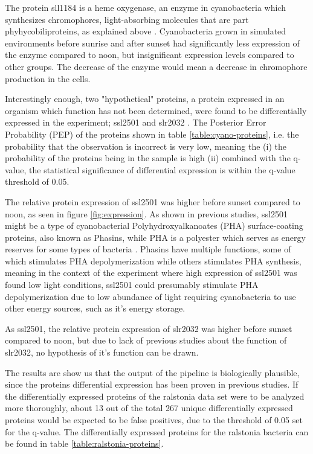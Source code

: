 The protein sll1184 is a heme oxygenase, an enzyme in cyanobacteria which synthesizes chromophores, light-absorbing molecules that are part phyhycobiliproteins, as explained above \cite{heme-oxygenase} \cite{heme-oxygenase-2}. Cyanobacteria grown in simulated environments before sunrise and after sunset had significantly less expression of the enzyme compared to noon, but insignificant expression levels compared to other groups. The decrease of the enzyme would mean a decrease in chromophore production in the cells.

Interestingly enough, two "hypothetical" proteins, a protein expressed in an organism which function has not been determined, were found to be differentially expressed in the experiment; ssl2501 and slr2032 \cite{hypothetical-protein1}. The Posterior Error Probability (PEP) of the proteins shown in table \ref{table:cyano-proteins}, i.e. the probability that the observation is incorrect is very low, meaning the (i) the probability of the proteins being in the sample is high (ii) combined with the q-value, the statistical significance of differential expression is within the q-value threshold of 0.05.

 The relative protein expression of ssl2501 was higher before sunset compared to noon, as seen in figure \ref{fig:expression}. As shown in previous studies, ssl2501 might be a type of cyanobacterial Polyhydroxyalkanoates (PHA) surface-coating proteins, also known as Phasins, while PHA is a polyester which serves as energy reserves for some types of bacteria \cite{phasins} \cite{ssl2501}. Phasins have multiple functions, some of which stimulates PHA depolymerization while others stimulates PHA synthesis, meaning in the context of the experiment where high expression of ssl2501 was found low light conditions, ssl2501 could presumably stimulate PHA depolymerization due to low abundance of light requiring cyanobacteria to use other energy sources, such as it's energy storage.

As ssl2501, the relative protein expression of slr2032 was higher before sunset compared to noon, but due to lack of previous studies about the function of slr2032, no hypothesis of it's function can be drawn.

The results are show us that the output of the pipeline is biologically plausible, since the proteins differential expression has been proven in previous studies. If the differentially expressed proteins of the ralstonia data set were to be analyzed more thoroughly, about 13 out of the total 267 unique  differentially expressed proteins would be expected to be false positives, due to the threshold of 0.05 set for the q-value. The differentially expressed proteins for the ralstonia bacteria can be found in table \ref{table:ralstonia-proteins}.
